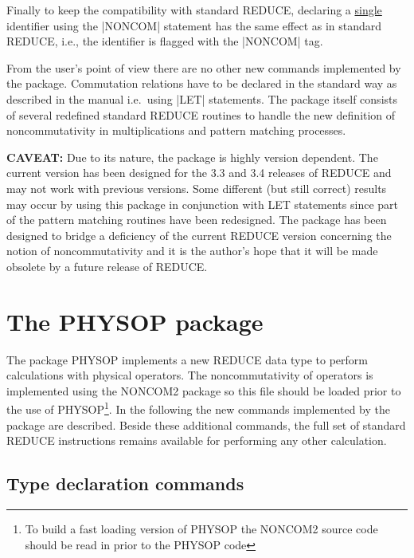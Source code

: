Finally to keep the compatibility with standard REDUCE, declaring a
\underline{single} identifier using the |NONCOM| statement has the same
effect as in
standard REDUCE, i.e., the identifier is flagged with the |NONCOM| tag.

From the user's point of view there are no other
new commands implemented by the package. Commutation
relations have to be declared in the standard way as described in
the manual i.e.\ using
|LET| statements. The package itself consists of several redefined
standard
REDUCE routines to handle the new definition of noncommutativity in
multiplications and pattern matching processes.

{\bf CAVEAT: } Due to its nature, the package is highly version
dependent. The current version has been designed for the 3.3  and 3.4
releases
of REDUCE and may not work with previous versions. Some different
(but still correct) results may occur by using this package in
conjunction with
LET statements since part of the pattern matching routines have been
redesigned. The package has been designed to bridge a deficiency of the
current REDUCE version concerning the notion of noncommutativity
 and it is the author's hope that it will be made  obsolete
by a future release of REDUCE.

\section{The PHYSOP package}

The package PHYSOP implements a new REDUCE data type to perform
calculations with physical operators. The noncommutativity of
operators is
implemented using the NONCOM2 package so this file should be loaded
prior to the use of PHYSOP\footnote{To build a fast
loading version of PHYSOP the NONCOM2
source code should be read in prior to the PHYSOP
code}.
In the following the new commands  implemented by the package
are described.  Beside these additional commands,
the full set of standard REDUCE instructions remains
available for performing  any other calculation.

\subsection{Type declaration commands}

